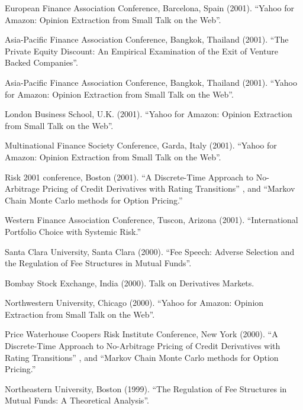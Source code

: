 \documentclass{article}
\begin{document}
\begin{etaremune}
{\item European Finance Association Conference, Barcelona, Spain (2001).
``Yahoo for Amazon: Opinion Extraction from Small Talk on the Web''. 

\item Asia-Pacific Finance Association Conference, Bangkok, Thailand (2001).
``The Private Equity Discount: An Empirical Examination of the
Exit of Venture Backed Companies''.

\item Asia-Pacific Finance Association Conference, Bangkok, Thailand (2001).
``Yahoo for Amazon: Opinion Extraction from Small Talk on the Web''. 

\item London Business School, U.K. (2001). 
``Yahoo for Amazon: Opinion Extraction from Small Talk on the Web''. 

\item Multinational Finance Society Conference, Garda, Italy (2001).
``Yahoo for Amazon: Opinion Extraction from Small Talk on the Web''. 

\item Risk 2001 conference, Boston (2001).
 ``A Discrete-Time Approach to No-Arbitrage Pricing of Credit
Derivatives with Rating Transitions'' , and  
``Markov Chain Monte Carlo methods for Option Pricing.''

\item Western Finance Association Conference, Tuscon, Arizona (2001).
``International Portfolio Choice with Systemic Risk.''

\item Santa Clara University, Santa Clara (2000). 
``Fee Speech: Adverse Selection and the Regulation of Fee 
Structures in Mutual Funds''. 

\item Bombay Stock Exchange, India (2000). Talk on Derivatives Markets.

\item Northwestern University, Chicago (2000). 
``Yahoo for Amazon: Opinion Extraction from Small Talk on the Web''.

\item Price Waterhouse Coopers Risk Institute Conference, New York (2000).
 ``A Discrete-Time Approach to No-Arbitrage Pricing of Credit
Derivatives with Rating Transitions'' , and  
``Markov Chain Monte Carlo methods for Option Pricing.''


\item Northeastern University, Boston (1999). 
``The Regulation of Fee Structures in Mutual Funds: A 
Theoretical Analysis''. 

}
\end{etaremune}
\end{document}
